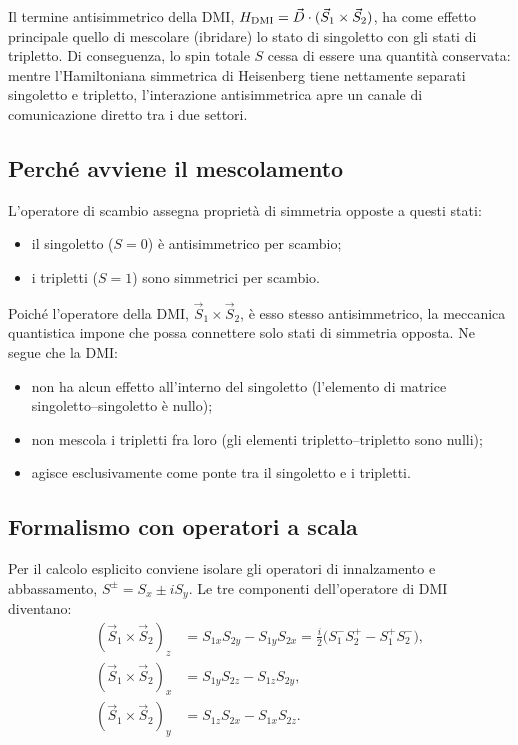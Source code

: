 \documentclass[11pt,a4paper]{article}
\begin{document}
Il termine antisimmetrico della DMI, $H_{\rm DMI}=\vec D\cdot(\vec S_1\times\vec S_2)$,
ha come effetto principale quello di mescolare (ibridare) lo stato di singoletto con
gli stati di tripletto. Di conseguenza, lo spin totale $S$ cessa di essere una
quantit\`a conservata: mentre l'Hamiltoniana simmetrica di Heisenberg tiene nettamente
separati singoletto e tripletto, l'interazione antisimmetrica apre un canale di
comunicazione diretto tra i due settori.

\subsection{Perch\'e avviene il mescolamento}

L'operatore di scambio assegna propriet\`a di simmetria opposte a questi stati:
\begin{itemize}
\item il singoletto ($S=0$) \`e antisimmetrico per scambio;
\item i tripletti ($S=1$) sono simmetrici per scambio.
\end{itemize}
Poich\'e l'operatore della DMI, $\vec S_1\times\vec S_2$, \`e esso stesso
antisimmetrico, la meccanica quantistica impone che possa connettere solo stati di
simmetria opposta. Ne segue che la DMI:
\begin{itemize}
\item non ha alcun effetto all'interno del singoletto (l'elemento di matrice
singoletto--singoletto \`e nullo);
\item non mescola i tripletti fra loro (gli elementi tripletto--tripletto sono nulli);
\item agisce esclusivamente come ponte tra il singoletto e i tripletti.
\end{itemize}

\subsection{Formalismo con operatori a scala}

Per il calcolo esplicito conviene isolare gli operatori di innalzamento e abbassamento,
$S^\pm=S_x\pm iS_y$. Le tre componenti dell'operatore di DMI diventano:
\begin{align}
(\vec S_1\times\vec S_2)_z &= S_{1x}S_{2y}-S_{1y}S_{2x} = \frac{i}{2}\big(S_1^-S_2^+-S_1^+S_2^-\big), \\
(\vec S_1\times\vec S_2)_x &= S_{1y}S_{2z}-S_{1z}S_{2y}, \\
(\vec S_1\times\vec S_2)_y &= S_{1z}S_{2x}-S_{1x}S_{2z}.
\end{align}
\end{document}
